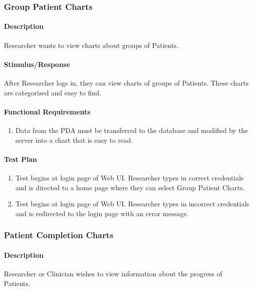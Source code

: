 \documentclass{article}
\begin{document}
\subsubsection{Group Patient Charts}\label{sec: Group Chart}

\paragraph{Description}
Researcher wants to view charts about groups of Patients.

\paragraph{Stimulus/Response}
After Researcher logs in, they can view charts of groups of Patients.  These charts are categorized and easy to find.

\paragraph{Functional Requirements}
\begin{enumerate}
\item Data from the PDA must be transferred to the database and modified by the server into a chart that is easy to read.
\end{enumerate}

\paragraph{Test Plan}
\begin{enumerate}
\item Test begins at login page of Web UI.  Researcher types in correct credentials and is directed to a home page where they can select Group Patient Charts.
\item Test begins at login page of Web UI.  Researcher types in incorrect credentials and is redirected to the login page with an error message.
\end{enumerate}

\subsubsection{Patient Completion Charts}\label{sec: Completion Chart}

\paragraph{Description}
Researcher or Clinician wishes to view information about the progress of Patients.
\end{document}
